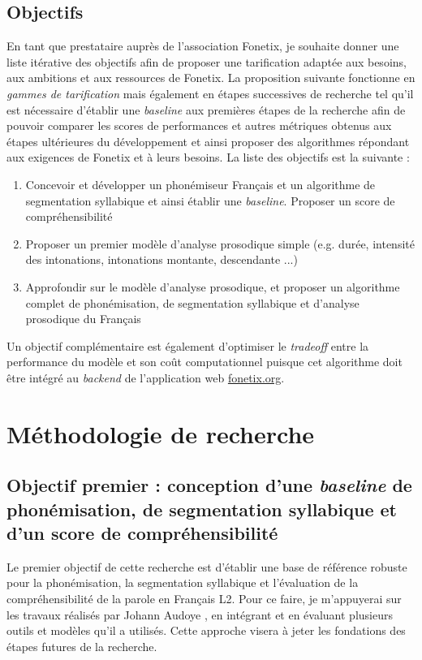 \documentclass[11pt,a4paper]{article}
\begin{document}
\subsection{Objectifs}
En tant que prestataire auprès de l'association Fonetix, je souhaite donner une liste itérative des objectifs afin de proposer une tarification adaptée aux besoins, aux ambitions et aux ressources de Fonetix.
La proposition suivante fonctionne en \textit{gammes de tarification} mais également en étapes successives de recherche tel qu'il est nécessaire d'établir une \textit{baseline} aux premières étapes de la recherche afin de pouvoir comparer les scores de performances et autres métriques obtenus aux étapes ultérieures du développement et ainsi proposer des algorithmes répondant aux exigences de Fonetix et à leurs besoins.
La liste des objectifs est la suivante :
\begin{enumerate}[leftmargin=1.5cm]
    \item Concevoir et développer un phonémiseur Français et un algorithme de segmentation syllabique et ainsi établir une \textit{baseline}. Proposer un score de compréhensibilité
    \item Proposer un premier modèle d'analyse prosodique simple (e.g. durée, intensité des intonations, intonations montante, descendante ...)
    \item Approfondir sur le modèle d'analyse prosodique, et proposer un algorithme complet de phonémisation, de segmentation syllabique et d'analyse prosodique du Français
\end{enumerate}

Un objectif complémentaire est également d'optimiser le \textit{tradeoff} entre la performance du modèle et son coût computationnel puisque cet algorithme doit être intégré au \textit{backend} de l'application web \url{fonetix.org}.

\section{Méthodologie de recherche}
\subsection{Objectif premier : conception d'une \textit{baseline} de phonémisation, de segmentation syllabique et d'un score de compréhensibilité}
Le premier objectif de cette recherche est d'établir une base de référence robuste pour la phonémisation, la segmentation syllabique et l'évaluation de la compréhensibilité de la parole en Français L2. Pour ce faire, je m'appuyerai sur les travaux réalisés par Johann Audoye \cite{audoye2025fonetix}, en intégrant et en évaluant plusieurs outils et modèles qu'il a utilisés. Cette approche visera à jeter les fondations des étapes futures de la recherche. \newline
\end{document}

